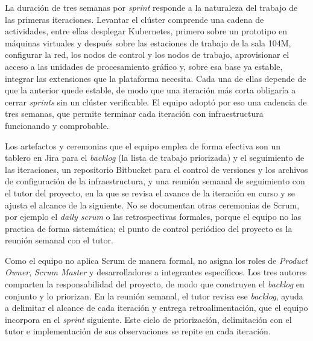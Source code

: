 La duración de tres semanas por \emph{sprint} responde a la naturaleza del trabajo de las primeras iteraciones. Levantar el clúster comprende una cadena de actividades, entre ellas desplegar Kubernetes, primero sobre un prototipo en máquinas virtuales y después sobre las estaciones de trabajo de la sala 104M, configurar la red, los nodos de control y los nodos de trabajo, aprovisionar el acceso a las unidades de procesamiento gráfico y, sobre esa base ya estable, integrar las extensiones que la plataforma necesita. Cada una de ellas depende de que la anterior quede estable, de modo que una iteración más corta obligaría a cerrar \emph{sprints} sin un clúster verificable. El equipo adoptó por eso una cadencia de tres semanas, que permite terminar cada iteración con infraestructura funcionando y comprobable.

Los artefactos y ceremonias que el equipo emplea de forma efectiva son un tablero en Jira para el \emph{backlog} (la lista de trabajo priorizada) y el seguimiento de las iteraciones, un repositorio Bitbucket para el control de versiones y los archivos de configuración de la infraestructura, y una reunión semanal de seguimiento con el tutor del proyecto, en la que se revisa el avance de la iteración en curso y se ajusta el alcance de la siguiente. No se documentan otras ceremonias de Scrum, por ejemplo el \emph{daily scrum} o las retrospectivas formales, porque el equipo no las practica de forma sistemática; el punto de control periódico del proyecto es la reunión semanal con el tutor.

Como el equipo no aplica Scrum de manera formal, no asigna los roles de \emph{Product Owner}, \emph{Scrum Master} y desarrolladores a integrantes específicos. Los tres autores comparten la responsabilidad del proyecto, de modo que construyen el \emph{backlog} en conjunto y lo priorizan. En la reunión semanal, el tutor revisa ese \emph{backlog}, ayuda a delimitar el alcance de cada iteración y entrega retroalimentación, que el equipo incorpora en el \emph{sprint} siguiente. Este ciclo de priorización, delimitación con el tutor e implementación de sus observaciones se repite en cada iteración.

